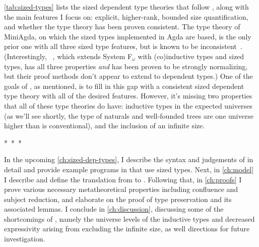 \cref{tab:sized-types} lists the sized dependent type theories that follow \CIChat,
along with the main features I focus on:
explicit, higher-rank, bounded size quantification,
and whether the type theory has been proven consistent.
The type theory of MiniAgda, on which the sized types implemented in Agda are based,
is the only prior one with all three sized type features,
but is known to be inconsistent~\citep{infinity}.
(Interestingly, \Fcopomega~\citep{F-omega-cop}, which extends System F$_\omega$ with (co)inductive types and sized types,
has all three properties \emph{and} has been proven to be strongly normalizing,
but their proof methods don't appear to extend to dependent types.)
One of the goals of \lang, as mentioned, is to fill in this gap
with a consistent sized dependent type theory with all of the desired features.
However, it's missing two properties that all of these type theories do have:
inductive types in the expected universes
(as we'll see shortly, the type of naturals and well-founded trees
are one universe higher than is conventional),
and the inclusion of an infinite size.


\vspace*{-0.5\baselineskip}
\begin{center}
\mbox{* * *}
\end{center}
\vspace*{-0.5\baselineskip}

\noindent In the upcoming \cref{ch:sized-dep-types}, I describe the syntax and judgements of \lang in detail
and provide example programs in \lang that use sized types.
Next, in \cref{ch:model} I describe \CICE and define the translation from \lang to \CICE.
Following that, in \cref{ch:proofs} I prove various necessary metatheoretical properties
including confluence and subject reduction,
and elaborate on the proof of type preservation and its associated lemmas.
I conclude in \cref{ch:discussion}, discussing some of the shortcomings of \lang,
namely the universe levels of the inductive types and
decreased expressivity arising from excluding the infinite size,
as well directions for future investigation.